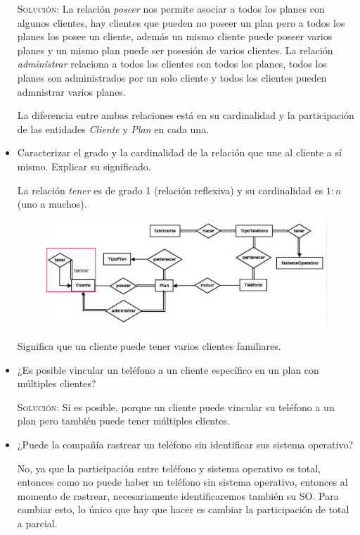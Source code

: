 \documentclass[letterpaper,11pt]{article}
\begin{document}
\begin{itemize}
    \textsc{Solución:} La relación \textit{poseer} nos permite asociar a todos los planes con algunos clientes, hay clientes que pueden no poseer un plan pero a todos los planes los posee un cliente, además un mismo cliente puede poseer varios planes y un mismo plan puede ser posesión de varios clientes.
    La relación \textit{administrar} relaciona a todos los clientes con todos los planes, todos los planes son administrados por un solo cliente y todos los clientes pueden admnistrar varios planes.

    La diferencia entre ambas relaciones está en su cardinalidad y la participación de las entidades \textit{Cliente} y \textit{Plan} en cada una.


    \item Caracterizar el grado y la cardinalidad de la relación que une al
    cliente a sí mismo. Explicar su significado.

    La relación \textit{tener} es de grado 1 (relación reflexiva) y su
    cardinalidad es $1:n$ (uno a muchos).

    \begin{figure}[H]
        \centering
        \includegraphics[scale=0.4]{./imagenes/modelo11.jpg}
    \end{figure}

    Significa que un cliente puede tener varios clientes familiares.
    \item ¿Es posible vincular un teléfono a un cliente específico en un plan
    con múltiples clientes?

    \textsc{Solución:}
    Sí es posible, porque un cliente puede vincular su teléfono a un plan pero también puede tener múltiples clientes.

    \item ¿Puede la compañía rastrear un teléfono sin identificar sus sistema
    operativo?

    No, ya que la participación entre teléfono y sistema operativo es total, entonces como no puede haber un teléfono sin sistema operativo, entonces al momento de rastrear, necesariamente identificaremos también su SO.
    Para cambiar esto, lo único que hay que hacer es cambiar la participación de total a parcial.

\end{itemize}
\end{document}
